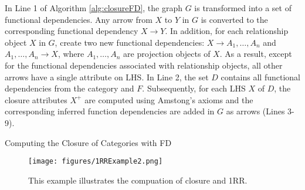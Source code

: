 
In Line 1 of Algorithm \ref{alg:closureFD}, the graph $G$ is transformed into a set of functional dependencies. Any arrow from $X$ to $Y$ in $G$ is converted to the corresponding functional dependency $X \to Y$. In addition, for each relationship object $X$ in $G$, create two new functional dependencies: $X \to A_1, \ldots, A_n$ and $A_1, \ldots, A_n \to X$, where $A_1, \ldots, A_n$ are projection objects of $X$.   As a result, except for the functional dependencies associated with relationship objects, all other arrows have a single attribute on LHS.  In Line 2, the set $D$ contains all functional dependencies from the category and $F$. Subsequently, for each LHS $X$ of $D$, the closure attributes $X^+$ are computed using Amstong's axioms and the corresponding inferred function dependencies are added in $G$ as arrows (Lines 3-9).






 




\begin{algorithm}
\caption{Computing the Closure of Categories with FD}
\label{alg:closureFD}

\end{algorithm}


\begin{figure}\centering\texttt{[image: figures/1RRExample2.png]}\caption{This example illustrates the compuation of closure and  1RR.}\label{fig:1RRExample}\end{figure}

